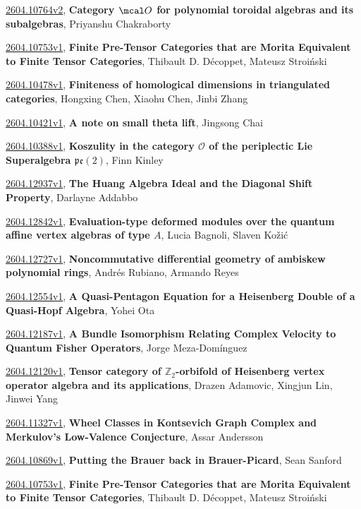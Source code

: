 \documentclass[9pt, a4paper]{article}
\theoremstyle{plain}
\theoremstyle{definition}
\theoremstyle{remark}
\newcommand{\arxiv}[3]{\href{https://arxiv.org/abs/#1}{#1}, \textbf{\textcolor{arxivblue}{#2}}, #3}
\begin{document}
\arxiv{2604.10764v2}{Category $\mcal O$ for polynomial toroidal algebras and its subalgebras}{Priyanshu Chakraborty}

\arxiv{2604.10753v1}{Finite Pre-Tensor Categories that are Morita Equivalent to Finite Tensor Categories}{Thibault D. Décoppet, Mateusz Stroiński}

\arxiv{2604.10478v1}{Finiteness of homological dimensions in triangulated categories}{Hongxing Chen, Xiaohu Chen, Jinbi Zhang}

\arxiv{2604.10421v1}{A note on small theta lift}{Jingsong Chai}

\arxiv{2604.10388v1}{Koszulity in the category $\mathcal{O}$ of the periplectic Lie Superalgebra $\mathfrak{pe}(2)$}{Finn Kinley}

\arxiv{2604.12937v1}{The Huang Algebra Ideal and the Diagonal Shift Property}{Darlayne Addabbo}

\arxiv{2604.12842v1}{Evaluation-type deformed modules over the quantum affine vertex algebras of type $A$}{Lucia Bagnoli, Slaven Kožić}

\arxiv{2604.12727v1}{Noncommutative differential geometry of ambiskew polynomial rings}{Andrés Rubiano, Armando Reyes}

\arxiv{2604.12554v1}{A Quasi-Pentagon Equation for a Heisenberg Double of a Quasi-Hopf Algebra}{Yohei Ota}

\arxiv{2604.12187v1}{A Bundle Isomorphism Relating Complex Velocity to Quantum Fisher Operators}{Jorge Meza-Domínguez}

\arxiv{2604.12120v1}{Tensor category of $\mathbb{Z}_2$-orbifold of Heisenberg vertex operator algebra and its applications}{Drazen Adamovic, Xingjun Lin, Jinwei Yang}

\arxiv{2604.11327v1}{Wheel Classes in Kontsevich Graph Complex and Merkulov's Low-Valence Conjecture}{Assar Andersson}

\arxiv{2604.10869v1}{Putting the Brauer back in Brauer-Picard}{Sean Sanford}

\arxiv{2604.10753v1}{Finite Pre-Tensor Categories that are Morita Equivalent to Finite Tensor Categories}{Thibault D. Décoppet, Mateusz Stroiński}

\end{document}

